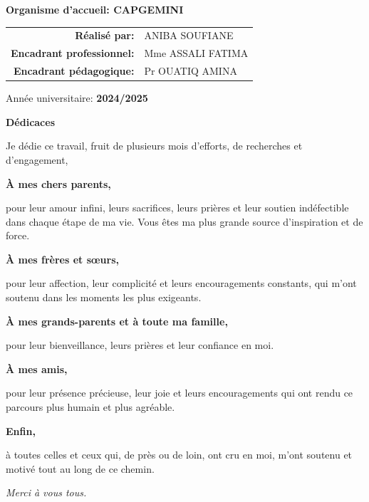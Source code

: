 \documentclass[12pt,a4paper]{report}
\begin{document}
\begin{center}
{\large \textbf{Organisme d'accueil: CAPGEMINI}}\\[1.5cm]


\begin{tabular}{@{}>{\bfseries}r l@{}}
  Réalisé par:& ANIBA SOUFIANE \\
  Encadrant professionnel:& Mme ASSALI FATIMA \\
  Encadrant pédagogique:& Pr OUATIQ AMINA \\
\end{tabular}

\vfill
{\large Année universitaire: \textbf{2024/2025}}

\end{center}

\clearpage
\thispagestyle{empty}
\begin{center}
    {\Large\bfseries Dédicaces}\par
    \vspace{1.2cm}

    \begin{minipage}{0.85\linewidth}
    \centering
    Je dédie ce travail, fruit de plusieurs mois d'efforts, de recherches et d'engagement,\par
    \vspace{0.6em}

    \textbf{À mes chers parents,}\par
    pour leur amour infini, leurs sacrifices, leurs prières et leur soutien indéfectible
    dans chaque étape de ma vie. Vous êtes ma plus grande source d'inspiration et de force.\par
    \vspace{0.8em}

    \textbf{À mes frères et sœurs,}\par
    pour leur affection, leur complicité et leurs encouragements constants,
    qui m'ont soutenu dans les moments les plus exigeants.\par
    \vspace{0.8em}

    \textbf{À mes grands-parents et à toute ma famille,}\par
    pour leur bienveillance, leurs prières et leur confiance en moi.\par
    \vspace{0.8em}

    \textbf{À mes amis,}\par
    pour leur présence précieuse, leur joie et leurs encouragements qui ont rendu
    ce parcours plus humain et plus agréable.\par
    \vspace{0.8em}

    \textbf{Enfin,}\par
    à toutes celles et ceux qui, de près ou de loin, ont cru en moi,
    m'ont soutenu et motivé tout au long de ce chemin.\par
    \vspace{1.2em}

    \emph{Merci à vous tous.}
    \end{minipage}
\end{center}
\end{document}
